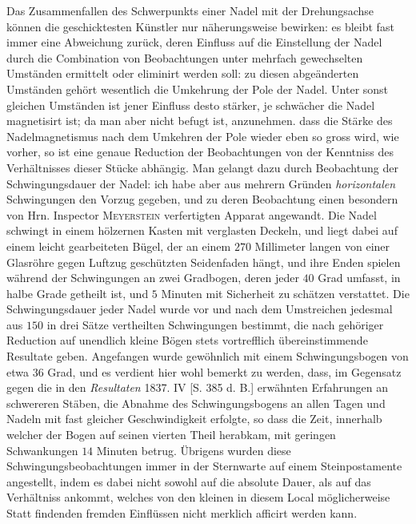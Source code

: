 \par{}
\par\clearpage
{}
Das Zusammenfallen des Schwerpunkts einer Nadel mit der Drehungsachse können die geschicktesten Künstler nur näherungsweise bewirken: es bleibt fast immer eine Abweichung zurück, deren Einfluss auf die Einstellung der Nadel durch die Combination von Beobachtungen unter mehrfach gewechselten Umständen ermittelt oder eliminirt werden soll: zu diesen abgeänderten Umständen gehört wesentlich die Umkehrung der Pole der Nadel. Unter sonst gleichen Umständen ist jener Einfluss desto stärker, je schwächer die Nadel magnetisirt ist; da man aber nicht befugt ist, anzunehmen. dass die Stärke des Nadelmagnetismus nach dem Umkehren der Pole wieder eben so gross wird, wie vorher, so ist eine genaue Reduction der Beobachtungen von der Kenntniss des Verhältnisses dieser Stücke abhängig. Man gelangt dazu durch Beobachtung der Schwingungsdauer der Nadel: ich habe aber aus mehrern Gründen \textit{horizontalen} Schwingungen den Vorzug gegeben, und zu deren Beobachtung einen besondern von Hrn. Inspector \textsc{Meyerstein} verfertigten Apparat angewandt. Die Nadel schwingt in einem hölzernen Kasten mit verglasten Deckeln, und liegt dabei auf einem leicht gearbeiteten Bügel, der an einem $270$ Millimeter langen von einer Glasröhre gegen Luftzug geschützten Seidenfaden hängt, und ihre Enden spielen während der Schwingungen an zwei Gradbogen, deren jeder $40$ Grad umfasst, in halbe Grade getheilt ist, und $5$ Minuten mit Sicherheit zu schätzen verstattet. Die Schwingungsdauer jeder Nadel wurde vor und nach dem Umstreichen jedesmal aus $150$ in drei Sätze vertheilten Schwingungen bestimmt, die nach gehöriger Reduction auf unendlich kleine Bögen stets vortrefflich übereinstimmende Resultate geben. Angefangen wurde gewöhnlich mit einem Schwingungsbogen von etwa $36$ Grad, und es verdient hier wohl bemerkt zu werden, dass, im Gegensatz gegen die in den \textit{Resultaten} 1837. IV [S. 385 d. B.] erwähnten Erfahrungen an schwereren Stäben, die Abnahme des Schwingungsbogens an allen Tagen und Nadeln mit fast gleicher Geschwindigkeit erfolgte, so dass die Zeit, innerhalb welcher der Bogen auf seinen vierten Theil herabkam, mit geringen Schwankungen $14$ Minuten betrug. Übrigens wurden diese Schwingungsbeobachtungen immer in der Sternwarte auf einem Steinpostamente angestellt, indem es dabei nicht sowohl auf die absolute Dauer, als auf das Verhältniss ankommt, welches von den kleinen in diesem Local möglicherweise Statt findenden fremden Einflüssen nicht merklich afficirt werden kann.

